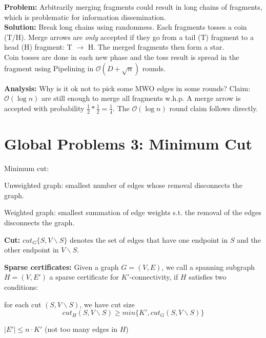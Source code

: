 \documentclass[a4paper, 8pt, landscape]{scrartcl}
\begin{document}
\begin{multicols*}{3}
\textbf{Problem:} Arbitrarily merging fragments could result in long chains of fragments, which is problematic for information dissemination.\\
\textbf{Solution:} Break long chains using randomness. Each fragments tosses a coin (T/H). Merge arrows are \textit{only} accepted if they go from a tail (T) fragment to a head (H) fragment: T $\rightarrow$ H. The merged fragments then form a star.\\
Coin tosses are done in each new phase and the toss result is spread in the fragment using Pipelining in $\mathcal{O}(D + \sqrt{n})$ rounds.

\textbf{Analysis:} Why is it ok not to pick some MWO edges in some rounds? Claim: $\mathcal{O}(\log n)$ are still enough to merge all fragments w.h.p. A merge arrow is accepted with probability $\frac{1}{2} * \frac{1}{2} = \frac{1}{4}$. The $\mathcal{O}(\log n)$ round claim follows directly.


\section{Global Problems 3: Minimum Cut}

Minimum cut:

\vspace*{-1mm}
\begin{compactitem}
\item Unweighted graph: smallest number of edges whose removal disconnects the graph.
\item Weighted graph: smallest summation of edge weights s.t. the removal of the edges disconnects the graph.
\end{compactitem}

\textbf{Cut:} $cut_G\{S, V\backslash S\}$ denotes the set of edges that have one endpoint in $S$ and the other endpoint in $V\backslash S$. 

\textbf{Sparse certificates:} Given a graph $G = (V,E)$, we call a spanning subgraph $H = (V, E')$ a sparse certificate for $K'$-connectivity, if $H$ satisfies two conditions:

\begin{compactenum}
\item for each cut $(S, V\backslash S)$, we have cut size 
\vspace*{-2mm}
$$cut_H(S, V\backslash S) \geq min\{K', cut_G(S, V\backslash S)\}$$
\vspace*{-5mm}
\item $|E'| \leq n \cdot K'$ (not too many edges in $H$)
\end{compactenum}


\end{multicols*}
\end{document}
